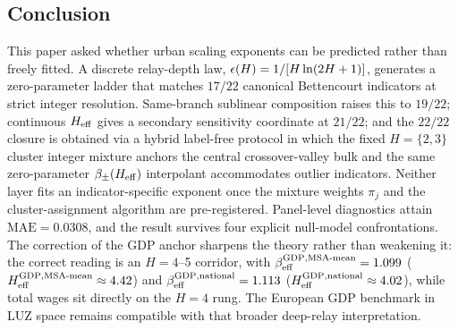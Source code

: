 \subsection{Conclusion}

This paper asked whether urban scaling exponents can be predicted rather than
freely fitted.
A discrete relay-depth law,
\(\epsilon\!\left(H\right)=1/[H\ln(2H+1)]\), generates a zero-parameter ladder that matches
\(17/22\) canonical Bettencourt indicators at strict integer resolution.
Same-branch sublinear composition raises this to \(19/22\); continuous
\(H_{\mathrm{eff}}\) gives a secondary sensitivity coordinate at \(21/22\); and the
\(22/22\) closure is obtained via a hybrid label-free protocol in which
the fixed \(H{=}\{2,3\}\) cluster integer mixture anchors the central
crossover-valley bulk and the same zero-parameter
\(\beta_{\pm}(H_{\mathrm{eff}})\) interpolant accommodates outlier indicators. Neither
layer fits an indicator-specific exponent once the mixture weights
\(\pi_j\) and the cluster-assignment algorithm are pre-registered.
Panel-level diagnostics attain \(\mathrm{MAE}=0.0308\), and the result
survives four explicit null-model confrontations.
The correction of the GDP anchor sharpens the theory rather than weakening it:
the correct reading is an \(H=4\)--5 corridor, with
\(\beta_{\mathrm{eff}}^{\mathrm{GDP,MSA\text{-}mean}}=1.099\)
(\(H_{\mathrm{eff}}^{\mathrm{GDP,MSA\text{-}mean}}\approx 4.42\)) and
\(\beta_{\mathrm{eff}}^{\mathrm{GDP,national}}=1.113\)
(\(H_{\mathrm{eff}}^{\mathrm{GDP,national}}\approx 4.02\)),
while total wages sit directly on the \(H=4\) rung.
The European GDP benchmark in LUZ space remains compatible with that broader
deep-relay interpretation.

